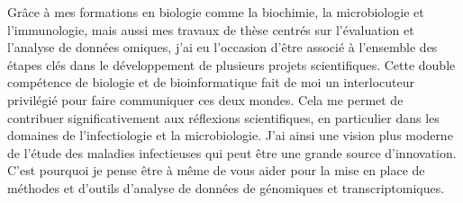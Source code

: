 \documentclass[11pt, a4paper]{awesome-cv}
\begin{document}
\begin{cvletter}
Grâce à mes formations en biologie comme la biochimie, la microbiologie et l’immunologie, mais aussi mes travaux de thèse centrés sur l’évaluation et l’analyse de données omiques, j’ai eu l’occasion d’être associé à l'ensemble des étapes clés dans le développement de plusieurs projets scientifiques. Cette double compétence de biologie et de bioinformatique fait de moi un interlocuteur privilégié pour faire communiquer ces deux mondes. Cela me permet de contribuer significativement aux réflexions scientifiques, en particulier dans les domaines de l’infectiologie et la microbiologie. J'ai ainsi une vision plus moderne de l’étude des maladies infectieuses qui peut être une grande source d’innovation. C'est pourquoi je pense être à même de vous aider pour la mise en place de méthodes et d’outils d'analyse de données de génomiques et transcriptomiques.

\end{cvletter}


\makeletterclosing
\end{document}
